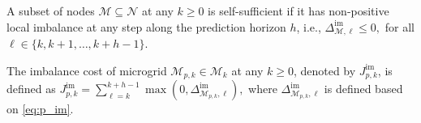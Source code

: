 \begin{defn}
	A subset of nodes $\mathcal{M}\subseteq\mathcal{N}$ at any $k\geq0$ is self-sufficient if it has non-positive local imbalance at any step along the prediction horizon $h$, i.e., $\Delta_{\mathcal{M},\ell}^{\mathrm{im}} \leq 0,$ for all $\ell \in \{k,k+1,\dots,k+h-1 \}$. \eod
	\label{def:ss_mg}
\end{defn}
\begin{defn}
	The imbalance cost of microgrid $\mathcal{M}_{p,k}\in\bm{\mathcal{M}}_k$ at any $k\geq0$, denoted by $J_{p,k}^{\mathrm{im}}$, is defined as
$	J_{p,k}^{\mathrm{im}} = \sum_{\ell =k}^{k+h-1}\max \left(0,\Delta_{\mathcal{M}_{p,k},\ell}^{\mathrm{im}}\right),$
	where $\Delta_{\mathcal{M}_{p,k},\ell}^{\mathrm{im}}$ is defined based on \eqref{eq:p_im}. \eod
	\label{def:im_cost}
\end{defn}

